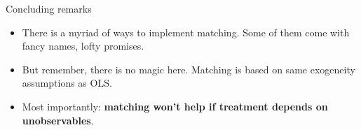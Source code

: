 \documentclass[beamer,compress]{beamer}
\begin{document}
\begin{frame}{Concluding remarks}
	\begin{itemize}
		\item{There is a myriad of ways to implement matching. Some of them come with fancy names, lofty promises.}
		\item{But remember, there is no magic here. Matching is based on same exogeneity assumptions as OLS.}
		\item{Most importantly: \textbf{matching won't help if treatment depends on unobservables}.}
	\end{itemize}
\end{frame}
\end{document}
